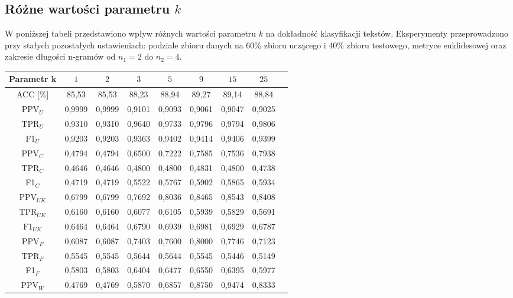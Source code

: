 \documentclass{article}
\begin{document}
\subsection{Różne wartości parametru \(k\)}
W poniższej tabeli przedstawiono wpływ różnych wartości parametru \(k\) na dokładność klasyfikacji tekstów. Eksperymenty przeprowadzono przy stałych pozostałych ustawieniach: podziale zbioru danych na 60\% zbioru uczącego i 40\% zbioru testowego, metryce euklidesowej oraz zakresie długości n-gramów od \(n_1 = 2\) do \(n_2 = 4\). \\
\begin{table}[h!]
    \centering
    \begin{tabular}{|c|c|c|c|c|c|c|c|c|}
    \hline
    \textbf{Parametr k} & \textbf{\(1\)} & \textbf{\(2\)} & \textbf{\(3\)} & \textbf{\(5\)}  & \textbf{\(9\)}  & \textbf{\(15\)} & \textbf{\(25\)} \\ \hline
    ACC [\%] & 85,53 & 85,53 & 88,23 & 88,94 & 89,27 & 89,14 & 88,84\\ \hline
    PPV\(_U\) & 0,9999 & 0,9999 & 0,9101 & 0,9093 & 0,9061 & 0,9047 & 0,9025\\ \hline
    TPR\(_U\) & 0,9310 & 0,9310 & 0,9640 & 0,9733 & 0,9796& 0,9794 & 0,9806\\ \hline
    F1\(_U\) & 0,9203 & 0,9203 & 0,9363 & 0,9402 & 0,9414& 0,9406 & 0,9399\\ \hline
    PPV\(_C\) & 0,4794 & 0,4794 & 0,6500 &  0,7222 & 0,7585& 0,7536& 0,7938\\ \hline
    TPR\(_C\) & 0,4646 & 0,4646 & 0,4800 &  0,4800& 0,4831& 0,4800& 0,4738\\ \hline
    F1\(_C\) & 0,4719 & 0,4719 & 0,5522 &  0,5767& 0,5902& 0,5865& 0,5934\\ \hline
    PPV\(_{UK}\) & 0,6799 & 0,6799 & 0,7692 & 0,8036& 0,8465& 0,8543& 0,8408\\ \hline
    TPR\(_{UK}\) & 0,6160 & 0,6160 & 0,6077 &  0,6105& 0,5939& 0,5829& 0,5691\\ \hline
    F1\(_{UK}\) & 0,6464 & 0,6464 & 0,6790 &  0,6939& 0,6981& 0,6929& 0,6787\\ \hline
    PPV\(_F\) & 0,6087 & 0,6087 & 0,7403 & 0,7600& 0,8000& 0,7746& 0,7123\\ \hline
    TPR\(_F\) & 0,5545 & 0,5545 & 0,5644 & 0,5644& 0,5545& 0,5446& 0,5149\\ \hline
    F1\(_F\) & 0,5803 & 0,5803 & 0,6404 &  0,6477& 0,6550& 0,6395& 0,5977\\ \hline
    PPV\(_W\) & 0,4769 & 0,4769 & 0,5870 & 0,6857& 0,8750& 0,9474& 0,8333\\ \hline

\end{tabular}
\end{table}
\end{document}
